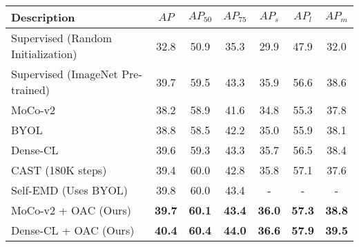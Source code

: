 






\begin{table*}
    \centering
    \begin{tabu} to \linewidth {lcccccc} 
        \toprule
        Description & $AP$ & $AP_{50}$ & $AP_{75}$ & $AP_{s}$ & $AP_{l}$ & $AP_{m}$ \\
         \midrule
    Supervised (Random Initialization) & 32.8 & 50.9 & 35.3 & 29.9 & 47.9 & 32.0 \\
    Supervised (ImageNet Pre-trained) & 39.7 & 59.5 & 43.3 & 35.9 & 56.6 & 38.6 \\
     \midrule
    MoCo-v2 \cite{chen2020improved}  & 38.2 & 58.9 & 41.6 & 34.8 & 55.3 & 37.8\\
    BYOL \cite{henaff2021efficient}  & 38.8 & 58.5 & 42.2 & 35.0 & 55.9& 38.1\\
    Dense-CL \cite{wang2021dense} & 39.6 & 59.3 & 43.3 & 35.7 & 56.5 & 38.4 \\
    CAST \cite{selvaraju2020casting} (180K steps) & 39.4 &  60.0 & 42.8 & 35.8 & 57.1 & 37.6 \\ 
    Self-EMD \cite{liu2021selfemd} (Uses BYOL)  & 39.8 & 60.0 & 43.4 & - & -& -\\
   
     MoCo-v2 + OAC (Ours)  & \textbf{39.7} & \textbf{60.1} & \textbf{43.4} & \textbf{36.0} & \textbf{57.3} & \textbf{38.8}\\
     
      Dense-CL + OAC (Ours)  & \textbf{40.4} & \textbf{60.4} & \textbf{44.0} & \textbf{36.6} & \textbf{57.9} & \textbf{39.5}\\
     

\end{tabu}
\end{table*}
